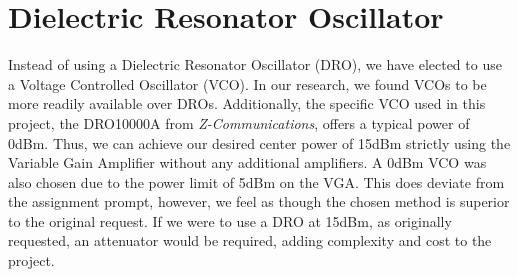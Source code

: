 \section{Dielectric Resonator Oscillator}

Instead of using a Dielectric Resonator Oscillator (DRO), we have elected to use a Voltage Controlled Oscillator (VCO). In our research, we found VCOs to be more readily available over DROs. Additionally, the specific VCO used in this project, the DRO10000A from \textit{Z-Communications}, offers a typical power of 0dBm. Thus, we can achieve our desired center power of 15dBm strictly using the Variable Gain Amplifier without any additional amplifiers. A 0dBm VCO was also chosen due to the power limit of 5dBm on the VGA. This does deviate from the assignment prompt, however, we feel as though the chosen method is superior to the original request. If we were to use a DRO at 15dBm, as originally requested, an attenuator would be required, adding complexity and cost to the project.